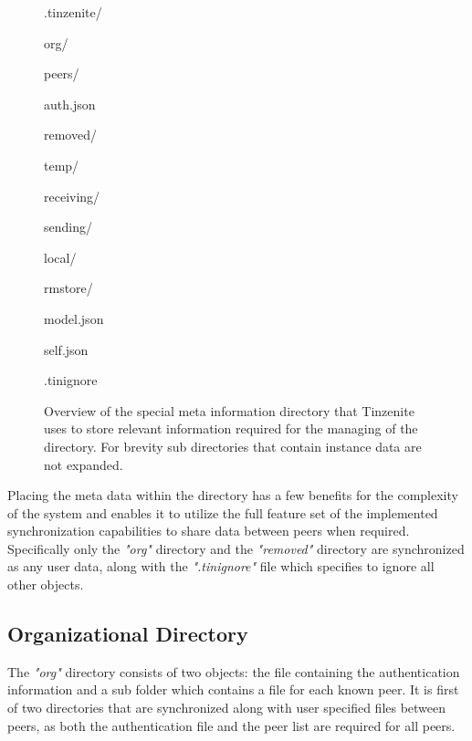 \begin{figure}[htp]
\begin{modellist}
\item .tinzenite/
\begin{modellist}
    \item org/
    \begin{modellist}
        \item peers/
        \item auth.json
    \end{modellist}
    \item removed/
    \item temp/
    \item receiving/
    \item sending/
    \item local/
    \begin{modellist}
        \item rmstore/
        \item model.json
        \item self.json
    \end{modellist}
    \item .tinignore
\end{modellist}
\end{modellist}
\caption[Meta Folder Structure]{Overview of the special meta information directory that Tinzenite uses to store relevant information required for the managing of the directory. For brevity sub directories that contain instance data are not expanded.}
\label{list:meta_folder}
\end{figure}

Placing the meta data within the directory has a few benefits for the complexity of the system and enables it to utilize the full feature set of the implemented synchronization capabilities to share data between peers when required.
Specifically only the \textit{"org"} directory and the \textit{"removed"} directory are synchronized as any user data, along with the \textit{".tinignore"} file which specifies to ignore all other objects.

\subsection{Organizational Directory}
\label{sub:Organizational Directory}

The \textit{"org"} directory consists of two objects: the file containing the authentication information and a sub folder which contains a file for each known peer.
It is first of two directories that are synchronized along with user specified files between peers, as both the authentication file and the peer list are required for all peers.

